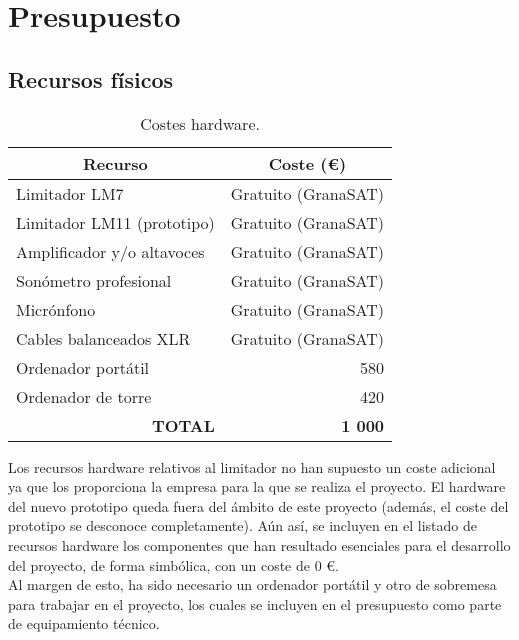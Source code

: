 \chapter{Presupuesto} \label{cap:presupuesto}

\section{Recursos físicos}

\begin{table}[H]
\centering
\begin{tabular}{lr}
\hline
\multicolumn{1}{c}{\textbf{Recurso}} & \multicolumn{1}{c}{\textbf{Coste (€)}} \\ \hline
Limitador LM7                        & Gratuito (GranaSAT)                    \\
Limitador LM11 (prototipo)           & Gratuito (GranaSAT)                    \\
Amplificador y/o altavoces           & Gratuito (GranaSAT)                    \\
Sonómetro profesional                & Gratuito (GranaSAT)                    \\
Micrónfono                           & Gratuito (GranaSAT)                    \\
Cables balanceados XLR               & Gratuito (GranaSAT)                    \\
Ordenador portátil                   & 580                                    \\
Ordenador de torre                   & 420                                    \\ \hline
\multicolumn{1}{r}{\textbf{TOTAL}}   & \textbf{1 000}
\end{tabular}%
\caption{Costes hardware.}
\label{tab:presupuesto-hardware}
\end{table}

Los recursos hardware relativos al limitador no han supuesto un coste adicional ya que los proporciona la empresa para la que se realiza el proyecto. El hardware del nuevo prototipo queda fuera del ámbito de este proyecto (además, el coste del prototipo se desconoce completamente). Aún así, se incluyen en el listado de recursos hardware los componentes que han resultado esenciales para el desarrollo del proyecto, de forma simbólica, con un coste de 0 €. \\
Al margen de esto, ha sido necesario un ordenador portátil y otro de sobremesa para trabajar en el proyecto, los cuales se incluyen en el presupuesto como parte de equipamiento técnico.

